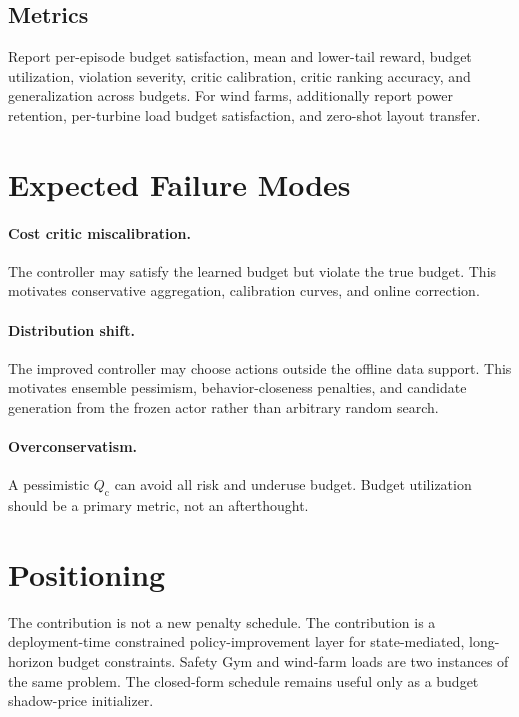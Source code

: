 \documentclass[11pt]{article}
\newcommand{\Qc}{Q_{\mathrm c}}
\begin{document}
\subsection{Metrics}

Report per-episode budget satisfaction, mean and lower-tail reward, budget utilization, violation severity, critic calibration, critic ranking accuracy, and generalization across budgets.
For wind farms, additionally report power retention, per-turbine load budget satisfaction, and zero-shot layout transfer.

\section{Expected Failure Modes}

\paragraph{Cost critic miscalibration.}
The controller may satisfy the learned budget but violate the true budget.
This motivates conservative aggregation, calibration curves, and online correction.

\paragraph{Distribution shift.}
The improved controller may choose actions outside the offline data support.
This motivates ensemble pessimism, behavior-closeness penalties, and candidate generation from the frozen actor rather than arbitrary random search.

\paragraph{Overconservatism.}
A pessimistic $\Qc$ can avoid all risk and underuse budget.
Budget utilization should be a primary metric, not an afterthought.

\section{Positioning}

The contribution is not a new penalty schedule.
The contribution is a deployment-time constrained policy-improvement layer for state-mediated, long-horizon budget constraints.
Safety Gym and wind-farm loads are two instances of the same problem.
The closed-form schedule remains useful only as a budget shadow-price initializer.



\end{document}
